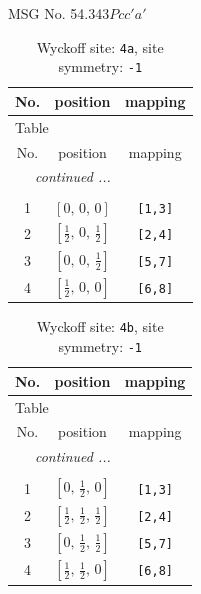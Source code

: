 \documentclass[fleqn,8pt]{jsarticle}
\begin{document}
\setcounter{MaxMatrixCols}{32}

\renewcommand{\tablename}{Table~}
\renewcommand{\figurename}{Figure~}
\begin{center}
\LARGE
MSG No. 54.343\quad$Pcc'a'$
\end{center}
\renewcommand{\arraystretch}{1.2}
\begin{longtable}{ccc}
\caption{Wyckoff site: {\tt 4a}, site symmetry: {\tt -1}}
 \\
 \hline \hline
No. & position & mapping \\ \hline \endfirsthead

\multicolumn{2}{l}{\tablename\ \thetable{}} \\
 \hline \hline
No. & position & mapping \\ \hline \endhead

 \hline \hline
\multicolumn{2}{r}{\footnotesize\it continued ...} \\ \endfoot

 \hline \hline
\multicolumn{2}{r}{} \\ \endlastfoot

1 & $\left[ 0,\, 0,\, 0 \right]$ & {\tt [1,3]} \\ \hline
2 & $\left[ \frac{1}{2},\, 0,\, \frac{1}{2} \right]$ & {\tt [2,4]} \\ \hline
3 & $\left[ 0,\, 0,\, \frac{1}{2} \right]$ & {\tt [5,7]} \\ \hline
4 & $\left[ \frac{1}{2},\, 0,\, 0 \right]$ & {\tt [6,8]} \\
\end{longtable}
\renewcommand{\arraystretch}{1.2}
\begin{longtable}{ccc}
\caption{Wyckoff site: {\tt 4b}, site symmetry: {\tt -1}}
 \\
 \hline \hline
No. & position & mapping \\ \hline \endfirsthead

\multicolumn{2}{l}{\tablename\ \thetable{}} \\
 \hline \hline
No. & position & mapping \\ \hline \endhead

 \hline \hline
\multicolumn{2}{r}{\footnotesize\it continued ...} \\ \endfoot

 \hline \hline
\multicolumn{2}{r}{} \\ \endlastfoot

1 & $\left[ 0,\, \frac{1}{2},\, 0 \right]$ & {\tt [1,3]} \\ \hline
2 & $\left[ \frac{1}{2},\, \frac{1}{2},\, \frac{1}{2} \right]$ & {\tt [2,4]} \\ \hline
3 & $\left[ 0,\, \frac{1}{2},\, \frac{1}{2} \right]$ & {\tt [5,7]} \\ \hline
4 & $\left[ \frac{1}{2},\, \frac{1}{2},\, 0 \right]$ & {\tt [6,8]} \\
\end{longtable}
\end{document}
